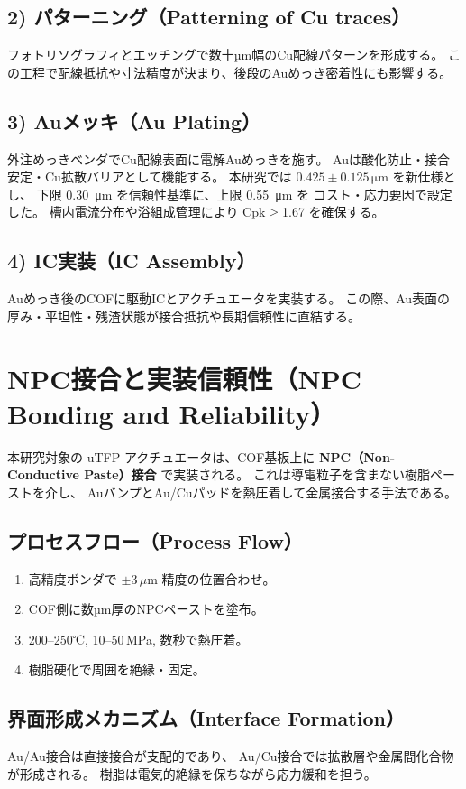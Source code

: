 \documentclass[onecolumn]{IEEEtran} %
\begin{document}
\subsection*{2) パターニング（Patterning of Cu traces）}
フォトリソグラフィとエッチングで数十µm幅のCu配線パターンを形成する。
この工程で配線抵抗や寸法精度が決まり、後段のAuめっき密着性にも影響する。

\subsection*{3) Auメッキ（Au Plating）}
外注めっきベンダでCu配線表面に電解Auめっきを施す。
Auは酸化防止・接合安定・Cu拡散バリアとして機能する。
本研究では \textbf{$0.425 \pm 0.125\,\si{\micro\meter}$} を新仕様とし、
下限 \SI{0.30}{\micro\meter} を信頼性基準に、上限 \SI{0.55}{\micro\meter} を
コスト・応力要因で設定した。
槽内電流分布や浴組成管理により Cpk$\geq$1.67 を確保する。

\subsection*{4) IC実装（IC Assembly）}
Auめっき後のCOFに駆動ICとアクチュエータを実装する。
この際、Au表面の厚み・平坦性・残渣状態が接合抵抗や長期信頼性に直結する。

\section{NPC接合と実装信頼性（NPC Bonding and Reliability）}

本研究対象の uTFP アクチュエータは、COF基板上に
\textbf{NPC（Non-Conductive Paste）接合} で実装される。
これは導電粒子を含まない樹脂ペーストを介し、
AuバンプとAu/Cuパッドを熱圧着して金属接合する手法である。

\subsection*{プロセスフロー（Process Flow）}
\begin{enumerate}
  \item 高精度ボンダで $\pm 3\,\mu$m 精度の位置合わせ。
  \item COF側に数µm厚のNPCペーストを塗布。
  \item 200--250℃, 10--50\,MPa, 数秒で熱圧着。
  \item 樹脂硬化で周囲を絶縁・固定。
\end{enumerate}

\subsection*{界面形成メカニズム（Interface Formation）}
Au/Au接合は直接接合が支配的であり、
Au/Cu接合では拡散層や金属間化合物が形成される。
樹脂は電気的絶縁を保ちながら応力緩和を担う。
\end{document}

